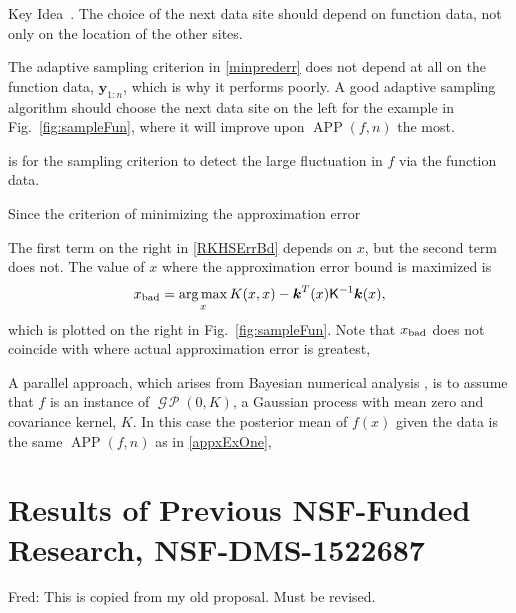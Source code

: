 \documentclass[11pt]{NSFamsart}
\DeclareMathOperator{\GP}{\mathcal{G} \! \mathcal{P}}
\DeclareMathOperator*{\argmax}{arg\,max}
\newcommand{\mK}{\mathsf{K}}
\DeclareMathOperator{\APP}{APP}
\newcommand{\bk}{{\boldsymbol{k}}}
\newcommand{\by}{{\boldsymbol{y}}}
\newcounter{keyideabean}[section]
\newenvironment{keyidea}{\refstepcounter{keyideabean}\par\bigskip
   \noindent\begin{itshape}%
   Key Idea~\thekeyideabean.\ignorespaces}%
   {\end{itshape}\ignorespacesafterend}
\newcommand{\FJHNote}[1]{{\color{blue}Fred: #1}}
\begin{document}
\begin{keyidea}\label{keyideafunction}
The choice of the next data site should depend on function data, not only on the location of the other sites.
\end{keyidea}
The adaptive sampling criterion in \eqref{minprederr} does not depend at all on the function data, $\by_{1:n}$, which is why it performs poorly.  A good adaptive sampling algorithm should choose the next data site on the left for the example in Fig.\ \ref{fig:sampleFun}, where it will improve upon $\APP(f,n)$ the most.

is for the sampling criterion to detect the large fluctuation in $f$ via the function data.  

Since the criterion of minimizing the approximation error 

The first term on the right in \eqref{RKHSErrBd} depends on $x$, but the second term does not.  The value of $x$ where the approximation error bound is maximized is
\begin{equation}
    x_{\textup{bad}} = \argmax_x K(x,x) - \bk^T(x) \mK^{-1} \bk(x),
\end{equation}
which is plotted on the right in Fig.\ \ref{fig:sampleFun}.  Note that $x_{\textup{bad}}$ does not coincide with where actual approximation error is greatest, 

A parallel approach, which arises from Bayesian numerical analysis \cite{}, is to assume that $f$ is an instance of $\GP(0,K)$, a Gaussian process with mean zero and covariance kernel, $K$.  In this case the posterior mean of $f(x)$ given the data is the same $\APP(f,n)$ as in \eqref{appxExOne},


\section{Results of Previous NSF-Funded Research,
NSF-DMS-1522687} \label{sec:Previous}
\FJHNote{This is copied from my old proposal.  Must be revised.}
\end{document}
